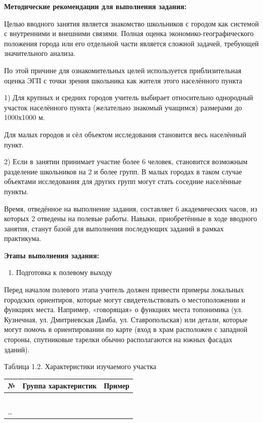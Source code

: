 \documentclass[
  11pt,
]{book}
\providecommand{\tightlist}{%
  \setlength{\itemsep}{0pt}\setlength{\parskip}{0pt}}
\begin{document}
\textbf{Методические рекомендации для выполнения задания:}

Целью вводного занятия является знакомство школьников с городом как системой с внутренними и внешними связями. Полная оценка экономико-географического положения города или его отдельной части является сложной задачей, требующей значительного анализа.

По этой причине для ознакомительных целей используется приблизительная оценка ЭГП с точки зрения школьника как жителя этого населённого пункта

1) Для крупных и средних городов учитель выбирает относительно однородный участок населённого пункта (желательно знакомый учащимся) размерами до 1000х1000 м.

Для малых городов и сёл объектом исследования становится весь населённый пункт.

2) Если в занятии принимает участие более 6 человек, становится возможным разделение школьников на 2 и более групп. В малых городах в таком случае объектами исследования для других групп могут стать соседние населённые пункты.

Время, отведённое на выполнение задания, составляет 6 академических часов, из которых 2 отведены на полевые работы. Навыки, приобретённые в ходе вводного занятия, станут базой для выполнения последующих заданий в рамках практикума.

\textbf{Этапы выполнения задания:}

\begin{enumerate}
\def\labelenumi{\arabic{enumi}.}
\tightlist
\item
  Подготовка к полевому выходу
\end{enumerate}

Перед началом полевого этапа учитель должен привести примеры локальных городских ориентиров, которые могут свидетельствовать о местоположении и функциях места. Например, «говорящая» о функциях места топонимика (ул. Кузнечная, ул. Дмитриевская Дамба, ул. Ставропольская) или детали, которые могут помочь в ориентировании по карте (вход в храм расположен с западной стороны, спутниковые тарелки обычно располагаются на южных фасадах зданий).

Таблица 1.2. Характеристики изучаемого участка

\begin{longtable}[]{@{}lll@{}}
\toprule\noalign{}
№ & Группа характеристик & Пример \\
\midrule\noalign{}
\endhead
\bottomrule\noalign{}
\endlastfoot
1 & ~ & ~ \\
\ldots{} & ~ & ~ \\
\end{longtable}
\end{document}
